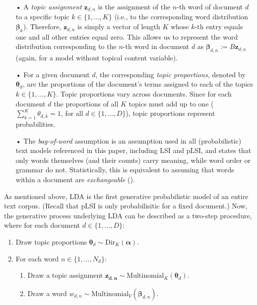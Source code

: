 \begin{itemize}
\vspace{-0.25cm}
\item[•] A \textit{topic assignment} $\boldsymbol{z}_{d,n}$ is the assignment of the $n$-th word of document $d$ to a specific topic $k \in \{1,\dots,K\}$ (i.e., to the corresponding word distribution $\boldsymbol{\beta}_k$). Therefore, $\boldsymbol{z}_{d,n}$ is simply a vector of length $K$ whose $k$-th entry equals one and all other entries equal zero. This allows us to represent the word distribution corresponding to the $n$-th word in document $d$ as $\boldsymbol{\beta}_{d,n}:=B\boldsymbol{z}_{d,n}$ (again, for a model without topical content variable).
\vspace{-0.25cm}
\item[•] For a given document $d$, the corresponding \textit{topic proportions}, denoted by $\boldsymbol{\theta}_d$, are the proportions of the document's terms assigned to each of the topics $k \in \{1,\dots,K\}$. Topic proportions vary across documents. Since for each document $d$ the proportions of all $K$ topics must add up to one ($\sum_{k=1}^{K}\theta_{d,k}=1$, for all $d \in \{1,\dots,D\}$), topic proportions represent probabilities.
\vspace{-0.25cm}
\item[•] The \textit{bag-of-word} assumption is an assumption used in all (probabilistic) text models referenced in this paper, including LSI and pLSI, and states that only words themselves (and their counts) carry meaning, while word order or grammar do not. Statistically, this is equivalent to assuming that words within a document are \textit{exchangeable} (\citealp{aldous1985exchangeability}).

\end{itemize}

As mentioned above, LDA is the first generative probabilistic model of an entire text corpus. (Recall that pLSI is only probabilisitic for a fixed document.) 
Now, the generative process underlying LDA can be described as a two-step procedure, where for each document $d \in \{1,\dots,D\}$:

\begin{enumerate}[{1)}]
\vspace{-0.25cm}
\item Draw topic proportions $\boldsymbol{\theta}_d \sim \text{Dir}_K(\boldsymbol{\alpha})$.
\vspace{-0.25cm}
\item For each word $n \in \{1,\dots,N_d\}$:
	\begin{enumerate}[{a)}]
	\vspace{-0.25cm}    
    \item Draw a topic assignment $\boldsymbol{z_{d,n}} \sim \text{Multinomial}_K(\boldsymbol{\theta}_d)$.
	\vspace{-0.25cm}    
    \item Draw a word $w_{d,n} \sim \text{Multinomial}_V(\boldsymbol{\beta}_{d,n})$.
	\end{enumerate}
\end{enumerate}

